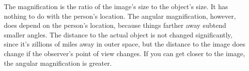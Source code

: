 The magnification is the ratio of the image's size to the
object's size. It has nothing to do with the person's
location. The angular magnification, however, does depend on
the person's location, because things farther away subtend
smaller angles. The distance to the actual object is not
changed significantly, since it's zillions of miles away in
outer space, but the distance to the image does change if
the observer's point of view changes. If you can get closer
to the image, the angular magnification is greater.
